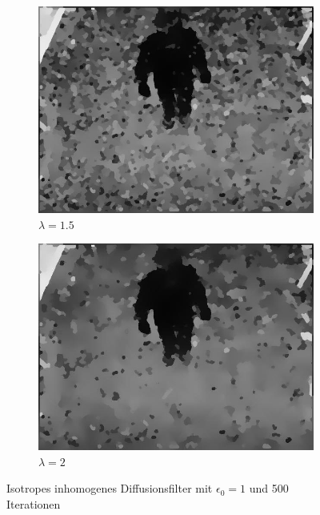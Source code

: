 \begin{figure}
	\begin{subfigure}{.49\textwidth}
		\centering
		\includegraphics[width=.99\linewidth]{A3/lambda1.5.jpg}
		\caption{$\lambda=1.5$}
	\end{subfigure}
	\begin{subfigure}{.49\textwidth}
		\centering
		\includegraphics[width=.99\linewidth]{A3/lambda2.jpg}
		\caption{$\lambda=2$}
	\end{subfigure}

	\caption{Isotropes inhomogenes Diffusionsfilter mit $\epsilon_0=1$ und 500 Iterationen}
\end{figure}